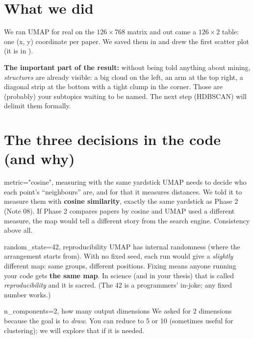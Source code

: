 \documentclass[11pt,a4paper]{article}
\begin{document}

\section{What we did}

We ran UMAP for real on the $126 \times 768$ matrix and out came a $126 \times 2$ table: one
(x, y) coordinate per paper. We saved them in  and
drew the first scatter plot (it is in ).

\textbf{The important part of the result:} without being told anything about mining,
\emph{structures} are already visible: a big cloud on the left, an arm at the top right, a
diagonal strip at the bottom with a tight clump in the corner. Those are (probably) your
subtopics waiting to be named. The next step (HDBSCAN) will delimit them formally.

\section{The three decisions in the code (and why)}

\begin{concepto}{metric="cosine", measuring with the same yardstick}
UMAP needs to decide who each point's ``neighbours'' are, and for that it measures distances.
We told it to measure them with \textbf{cosine similarity}, exactly the same yardstick as
Phase 2 (Note 08). If Phase 2 compares papers by cosine and UMAP used a different measure, the
map would tell a different story from the search engine. Consistency above all.
\end{concepto}

\begin{concepto}{random\_state=42, reproducibility}
UMAP has internal randomness (where the arrangement starts from). With no fixed seed, each run
would give a \emph{slightly} different map: same groups, different positions. Fixing
 means anyone running your code gets \textbf{the same map}. In
science (and in your thesis) that is called \emph{reproducibility} and it is sacred.
(The 42 is a programmers' in-joke; any fixed number works.)
\end{concepto}

\begin{concepto}{n\_components=2, how many output dimensions}
We asked for 2 dimensions because the goal is to \emph{draw}. You can reduce to 5 or 10
(sometimes useful for clustering); we will explore that if it is needed.
\end{concepto}
\end{document}
